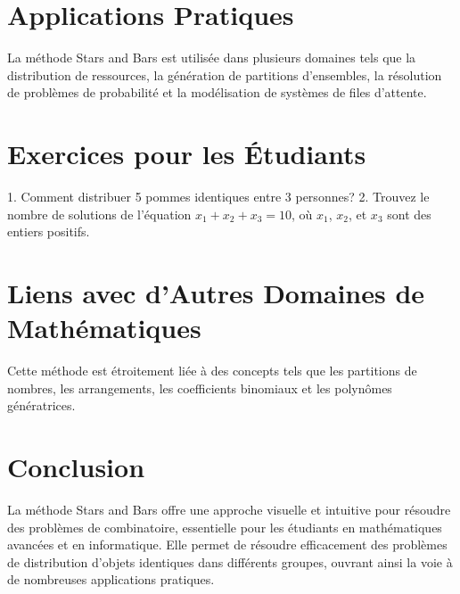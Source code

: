 \documentclass{article}
\begin{document}
\section{Applications Pratiques}
La méthode Stars and Bars est utilisée dans plusieurs domaines tels que la distribution de ressources, la génération de partitions d'ensembles, la résolution de problèmes de probabilité et la modélisation de systèmes de files d'attente.

\section{Exercices pour les Étudiants}
1. Comment distribuer 5 pommes identiques entre 3 personnes?
2. Trouvez le nombre de solutions de l'équation \(x_1 + x_2 + x_3 = 10\), où \(x_1\), \(x_2\), et \(x_3\) sont des entiers positifs.

\section{Liens avec d'Autres Domaines de Mathématiques}
Cette méthode est étroitement liée à des concepts tels que les partitions de nombres, les arrangements, les coefficients binomiaux et les polynômes génératrices.

\section{Conclusion}
La méthode Stars and Bars offre une approche visuelle et intuitive pour résoudre des problèmes de combinatoire, essentielle pour les étudiants en mathématiques avancées et en informatique. Elle permet de résoudre efficacement des problèmes de distribution d'objets identiques dans différents groupes, ouvrant ainsi la voie à de nombreuses applications pratiques.
\end{document}
